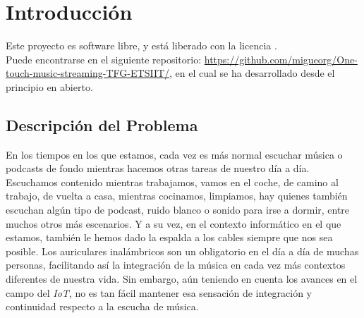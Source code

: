 \chapter{Introducción}

Este proyecto es software libre, y está liberado con la licencia \cite{gplv3}.\\

Puede encontrarse en el siguiente repositorio: \url{https://github.com/migueorg/One-touch-music-streaming-TFG-ETSIIT/}, en el cual se ha desarrollado desde el principio en abierto.

\section{Descripción del Problema}
En los tiempos en los que estamos, cada vez es más normal escuchar música o podcasts de fondo mientras hacemos otras tareas de nuestro día a día. Escuchamos contenido mientras trabajamos, vamos en el coche, de camino al trabajo, de vuelta a casa, mientras cocinamos, limpiamos, hay quienes también escuchan algún tipo de podcast, ruido blanco o sonido para irse a dormir, entre muchos otros más escenarios. Y a su vez, en el contexto informático en el que estamos, también le hemos dado la espalda a los cables siempre que nos sea posible. Los auriculares inalámbricos son un obligatorio en el día a día de muchas personas, facilitando así la integración de la música en cada vez más contextos diferentes de nuestra vida. Sin embargo, aún teniendo en cuenta los avances en el campo del \emph{IoT}, no es tan fácil mantener esa sensación de integración y continuidad respecto a la escucha de música.\\

